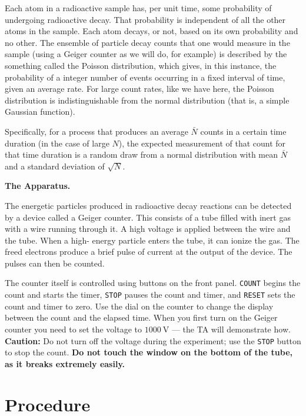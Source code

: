Each atom in a radioactive sample has, per unit time, some probability of undergoing
radioactive decay. That probability is independent of all the other atoms in the sample.
Each atom decays, or not, based on its own probability and no other. The ensemble of
particle decay counts that one would measure in the sample (using a Geiger counter as we will
do, for example) is described by the something called the Poisson distribution, which
gives, in this instance, the probability of a integer number of events occurring in a fixed
interval of time, given an average rate. For large count rates, like we have here, the
Poisson distribution is indistinguishable from the normal distribution (that is, a simple
Gaussian function).

Specifically, for a process that produces an average $\bar{N}$ counts in a certain time duration (in the case of large $N$), the expected measurement of that count for that time duration is a
random draw from a normal distribution with mean $\bar{N}$ and a standard deviation of
$\sqrt{N}$.

\begin{framed}
	\textbf{The Apparatus.}
	
	The energetic particles produced in radioactive decay reactions can be detected by a
	device called a Geiger counter. This consists of a tube filled with inert gas with a wire
	running through it. A high voltage is applied between the wire and the tube. When a high-
	energy particle enters the tube, it can ionize the gas. The freed electrons produce a brief
	pulse of current at the output of the device. The pulses can then be counted.
	
	The counter itself is controlled using buttons on the front panel. \texttt{COUNT} begins the count
	and starts the timer, \texttt{STOP} pauses the count and timer, and \texttt{RESET} sets the count and
	timer to zero. Use the dial on the counter to change the display between the count and the
	elapsed time. When you first turn on the Geiger counter you need to set the voltage to
	$1000\:$V --- the TA will demonstrate how. \textbf{Caution:} Do not turn off the voltage during the
	experiment; use the \texttt{STOP} button to stop the count. \textbf{Do not touch the window on the
		bottom of the tube, as it breaks extremely easily.}
\end{framed}

\section{Procedure}

